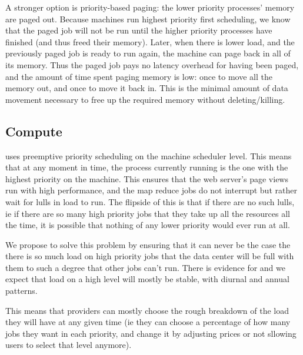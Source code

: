 A stronger option is priority-based paging: the lower priority processes' memory
are paged out. Because machines run highest priority first scheduling, we know
that the paged job will not be run until the higher priority processes have
finished (and thus freed their memory). Later, when there is lower load, and the previously
paged job is ready to run again, the machine can page back in all of its memory.
Thus the paged job pays no latency overhead for having been paged, and the
amount of time spent paging memory is low: once to move all the memory out, and
once to move it back in. This is the minimal amount of data movement necessary
to free up the required memory without deleting/killing.


\subsection{Compute}

\sys{} uses preemptive priority scheduling on the machine scheduler level. This
means that at any moment in time, the process currently running is the one with
the highest priority on the machine. This ensures that the web server's page
views run with high performance, and the map reduce jobs do not interrupt but
rather wait for lulls in load to run. The flipside of this is that if there are
no such lulls, ie if there are so many high priority jobs that they take up all
the resources all the time, it is possible that nothing of any lower priority
would ever run at all.

We propose to solve this problem by ensuring that it can never be the case the
there is so much load on high priority jobs that the data center will be full
with them to such a degree that other jobs can't run. There is evidence for and
we expect that load on a high level will mostly be stable, with diurnal and
annual patterns.\cite{TODO}

This means that providers can mostly choose the rough breakdown of the load they
will have at any given time (ie they can choose a percentage of how many jobs
they want in each priority, and change it by adjusting prices or not sllowing
users to select that level anymore). 



